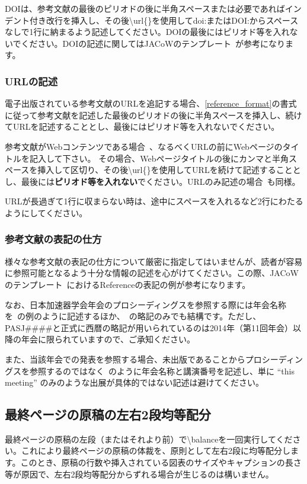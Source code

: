 \documentclass{PASJ2024}
\begin{document}
DOIは、参考文献の最後のピリオドの後に半角スペースまたは必要であればインデント付き改行を挿入し、その後\textbackslash{url}\{\}を使用してdoi:またはDOI:からスペースなしで1行に納まるよう記述してください。DOIの最後にはピリオド等を入れないでください。DOIの記述に関してはJACoWのテンプレート~\cite{Reference_JACoW_TeX}が参考になります。

\subsubsection{URLの記述}
電子出版されている参考文献のURLを追記する場合、\ref{reference_format}の書式に従って参考文献を記述した最後のピリオドの後に半角スペースを挿入し、続けてURLを記述することとし、最後にはピリオド等を入れないでください。

参考文献がWebコンテンツである場合~\cite{Reference_2, item:2-1, item:7, item:8}、なるべくURLの前にWebページのタイトルを記入して下さい。
その場合、Webページタイトルの後にカンマと半角スペースを挿入して区切り、その後\textbackslash{url}\{\}を使用してURLを続けて記述することとし、最後には\textbf{ピリオド等を入れない}でください。URLのみ記述の場合~\cite{Reference_1_URL}も同様。

URLが長過ぎて1行に収まらない時は、途中にスペースを入れるなど2行にわたるようにしてください。

\subsubsection{参考文献の表記の仕方}
様々な参考文献の表記の仕方について厳密に指定してはいませんが、読者が容易に参照可能となるよう十分な情報の記述を心がけてください。この際、JACoWのテンプレート~\cite{Reference_JACoW_TeX}におけるReferenceの表記の例が参考になります。

なお、日本加速器学会年会のプロシーディングスを参照する際には年会名称を~\cite{item:9,item:10}の例のように記述するほか、~\cite{item:11,item:12}の略記のみでも結構です。ただし、PASJ\#\#\#\#と正式に西暦の略記が用いられているのは2014年（第11回年会）以降の年会に限られていますので、ご承知ください。

また、当該年会での発表を参照する場合、未出版であることからプロシーディングスを参照するのではなく~\cite{item:13,item:14}のように年会名称と講演番号を記述し、単に ``this meeting'' のみのような出展が具体的ではない記述は避けてください。
%
\subsection{最終ページの原稿の左右2段均等配分}
最終ページの原稿の左段（またはそれより前）で\textbackslash{balance}を一回実行してください。これにより最終ページの原稿の体裁を、原則として左右2段に均等配分します。このとき、原稿の行数や挿入されている図表のサイズやキャプションの長さ等が原因で、左右2段均等配分からずれる場合が生じるのは構いません。
%
\end{document}
